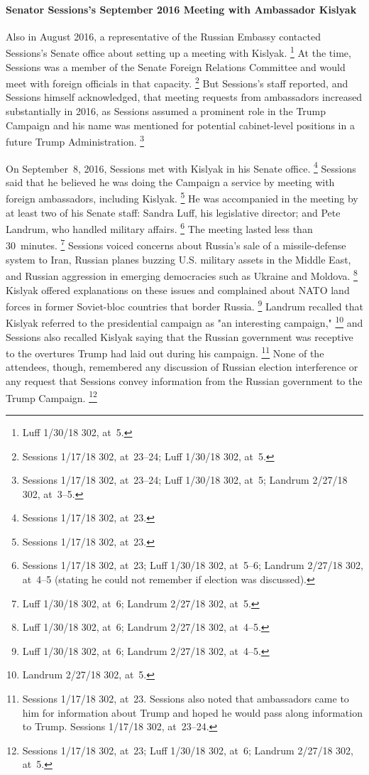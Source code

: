 \paragraph{Senator Sessions's September 2016 Meeting with Ambassador Kislyak}

Also in August 2016, a representative of the Russian Embassy contacted Sessions's Senate office about setting up a meeting with Kislyak.%
\footnote{Luff 1/30/18 302, at~5.}
At the time, Sessions was a member of the Senate Foreign Relations Committee and would meet with foreign officials in that capacity.%
\footnote{Sessions 1/17/18 302, at~23--24;
Luff 1/30/18 302, at~5.}
But Sessions's staff reported, and Sessions himself acknowledged, that meeting requests from ambassadors increased substantially in 2016, as Sessions assumed a prominent role in the Trump Campaign and his name was mentioned for potential cabinet-level positions in a future Trump Administration.%
\footnote{Sessions 1/17/18 302, at~23--24;
Luff 1/30/18 302, at~5;
Landrum 2/27/18 302, at~3--5.}

On September~8, 2016, Sessions met with Kislyak in his Senate office.%
\footnote{Sessions 1/17/18 302, at~23.}
Sessions said that he believed he was doing the Campaign a service by meeting with foreign ambassadors, including Kislyak.%
\footnote{Sessions 1/17/18 302, at~23.}
He was accompanied in the meeting by at least two of his Senate staff: Sandra Luff, his legislative director; and Pete Landrum, who handled military affairs.%
\footnote{Sessions 1/17/18 302, at~23;
Luff 1/30/18 302, at~5--6;
Landrum 2/27/18 302, at~4--5 (stating he could not remember if election was discussed).}
The meeting lasted less than 30~minutes.%
\footnote{Luff 1/30/18 302, at~6;
Landrum 2/27/18 302, at~5.}
Sessions voiced concerns about Russia's sale of a missile-defense system to Iran, Russian planes buzzing U.S. military assets in the Middle East, and Russian aggression in emerging democracies such as Ukraine and Moldova.%
\footnote{Luff 1/30/18 302, at~6;
Landrum 2/27/18 302, at~4--5.}
Kislyak offered explanations on these issues and complained about NATO land forces in former Soviet-bloc countries that border Russia.%
\footnote{Luff 1/30/18 302, at~6;
Landrum 2/27/18 302, at~4--5.}
Landrum recalled that Kislyak referred to the presidential campaign as "an interesting campaign,"%
\footnote{Landrum 2/27/18 302, at~5.}
and Sessions also recalled Kislyak saying that the Russian government was receptive to the overtures Trump had laid out during his campaign.%
\footnote{Sessions 1/17/18 302, at~23.
Sessions also noted that ambassadors came to him for information about Trump and hoped he would pass along information to Trump.
Sessions 1/17/18 302, at~23--24.}
None of the attendees, though, remembered any discussion of Russian election interference or any request that Sessions convey information from the Russian government to the Trump Campaign.%
\footnote{Sessions 1/17/18 302, at~23;
Luff 1/30/18 302, at~6;
Landrum 2/27/18 302, at~5.}

